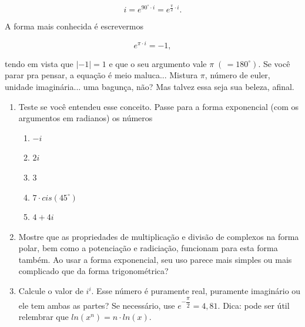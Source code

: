 \documentclass[a4paper, 11pt]{article}
\begin{document}
\begin{enumerate}
$$i = e^{ 90^{\circ} \cdot i} = e^{\frac{\pi}{2} \cdot i} .$$

A forma mais conhecida é escrevermos 

$$e^{\pi \cdot i} = -1,$$

tendo em vista que $|-1| = 1$ e que o seu argumento vale $\pi \; ( \, = 180^{\circ}).$ Se você parar pra pensar, a equação é meio maluca... Mistura $\pi$, número de euler, unidade imaginária... uma bagunça, não? Mas talvez essa seja sua beleza, afinal.

	\begin{enumerate}
	
	\item Teste se você entendeu esse conceito. Passe para a forma exponencial (com os argumentos em radianos) os números
		\begin{enumerate}
		\item $-i$
		\item $2i$
		\item $3$
		\item $7\cdot cis(45^{\circ})$
		\item $4 + 4i$
		\end{enumerate}
		
	\item Mostre que as propriedades de multiplicação e divisão de complexos na forma polar, bem como a potenciação e radiciação, funcionam para esta forma também. Ao usar a forma exponencial, seu uso parece mais simples ou mais complicado que da forma trigonométrica? 
	
	\item Calcule o valor de $i^i$. Esse número é puramente real, puramente imaginário ou ele tem ambas as partes?
	 Se necessário, use $e^{-\dfrac{\pi}{2}} = 4,81.$
	 Dica: pode ser útil relembrar que $ln(x^n) = n\cdot ln(x).$			
	
	\end{enumerate}


\end{enumerate}
\end{document}
